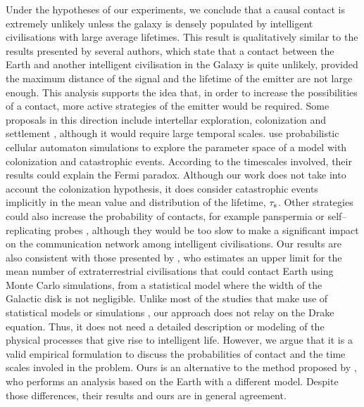 \documentclass[crop]{CSLB}
\begin{document}
Under the hypotheses of our experiments, we conclude that a causal
contact is extremely unlikely unless the galaxy is densely populated
by intelligent civilisations with large average lifetimes.
%
This result is qualitatively similar to the results presented by
several authors, which state that a contact between the Earth and
another intelligent civilisation in the Galaxy is quite unlikely,
provided the maximum distance of the signal and the lifetime of the
emitter are not large enough.
%
This analysis supports the idea that, in order to increase the
possibilities of a contact, more active strategies of the emitter
would be required.
%
Some proposals in this direction include intertellar exploration,
colonization and settlement \citep{brin_great_1983, Dosovic2019,
galera_invasion_2019}, although it would require large temporal
scales.
%
\citet{Dosovic2019} use probabilistic cellular automaton simulations
to explore the parameter space of a model with colonization and
catastrophic events.
%
According to the timescales involved, their results could explain the
Fermi paradox.
%
Although our work does not take into account the colonization
hypothesis, it does consider catastrophic events implicitly in the
mean value and distribution of the lifetime, $\tau_{\rm s}$.
%
Other strategies could also increase the probability of contacts, for
example panspermia \citep[e.g.,][]{starling_virulence_2013} or
self--replicating probes \citep[e.g.,][]{barlow_galactic_2013},
although they would be too slow to make a significant impact on the
communication network among intelligent civilisations.
%
Our results are also consistent with those presented by
\citet{grimaldi_signal_2017}, who estimates an upper limit for the
mean number of extraterrestrial civilisations that could contact Earth
using Monte Carlo simulations, from a statistical model where the
width of the Galactic disk is not negligible.
%
Unlike most of the studies that make use of statistical models or
simulations \citep{cirkovic_temporal_2004, smith_broadcasting_2009,
bloetscher_using_2019}, our approach does not relay on the Drake
equation.
%
Thus, it does not need a detailed description or modeling of the physical
processes that give rise to intelligent life.
%
However, we argue that it is a valid empirical formulation to discuss
the probabilities of contact and the time scales involed in the
problem.
%
Ours is an alternative to the method proposed by
\citet{balbi_impact_2018}, who performs an analysis based on the Earth
with a different model.
%
Despite those differences, their results and ours are in general agreement.
\end{document}
